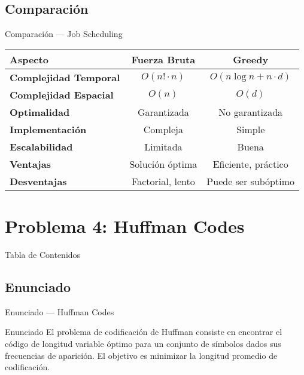 \documentclass[aspectratio=169]{beamer}
\begin{document}
\subsection{Comparación}
\begin{frame}{Comparación — Job Scheduling}
  \begin{table}[h]
  \centering
  \begin{tabular}{|l|c|c|}
  \hline
  \textbf{Aspecto} & \textbf{Fuerza Bruta} & \textbf{Greedy} \\
  \hline
  \textbf{Complejidad Temporal} & $O(n! \cdot n)$ & $O(n \log n + n \cdot d)$ \\
  \textbf{Complejidad Espacial} & $O(n)$ & $O(d)$ \\
  \textbf{Optimalidad} & Garantizada & No garantizada \\
  \textbf{Implementación} & Compleja & Simple \\
  \textbf{Escalabilidad} & Limitada & Buena \\
  \hline
  \textbf{Ventajas} & Solución óptima & Eficiente, práctico \\
  \textbf{Desventajas} & Factorial, lento & Puede ser subóptimo \\
  \hline
  \end{tabular}
  \end{table}
\end{frame}

\section{Problema 4: Huffman Codes}
\begin{frame}{Tabla de Contenidos}
\end{frame}

\subsection{Enunciado}
\begin{frame}{Enunciado — Huffman Codes}
  \begin{block}{Enunciado}
    El problema de codificación de Huffman consiste en encontrar el código de longitud variable óptimo para un conjunto de símbolos dados sus frecuencias de aparición. El objetivo es minimizar la longitud promedio de codificación.
  \end{block}
\end{frame}
\end{document}
